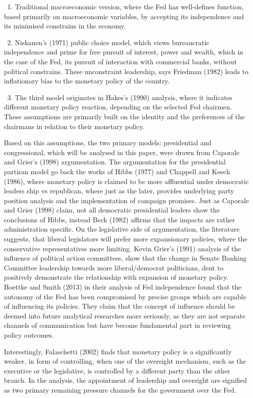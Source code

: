 \documentclass[11pt]{article}
\begin{document}
\ 1. Traditional macroeconomic version, where the Fed has well-defines function, based primarily on macroeconomic variables, by accepting its independence and its minimised constrains in the economy. \

\ 2. Niskanen's (1971) public choice model, which views bureaucratic independence and prime for free pursuit of interest, power and wealth, which in the case of the Fed, its pursuit of interaction with commercial banks, without political constrains. These unconstraint leadership, says Friedman (1982) leads to inflationary bias to the monetary policy of the country. \

\ 3. The third model originates in Hakes's (1990) analysis, where it indicates different monetary policy reaction, depending on the selected Fed chairmen. These assumptions are primarily built on the identity and the preferences of the chairmans in relation to their monetary policy.
 
Based on this assumptions, the two primary models: presidential and congressional, which will be analysed in this paper, were drawn from Caporale and Grier's (1998) argumentation. The argumentation for the presidential partisan model go back the works of Hibbs (1977) and Chappell and Keech  (1986), where monetary policy is claimed to be more affluential under democratic leaders ship vs republican, where just as the later, provides underlying party position analysis and the implementation of campaign promises. Just as Caporale and Grier (1998) claim, not all democratic presidential leaders show the conclusions of Hibbs, instead Beck (1982) affirms that the impacts are rather administration specific.
On the legislative side of argumentation, the literature suggests, that liberal legislators will prefer more expansionary policies, where the conservative representatives more limiting. Kevin Grier's (1991) analysis of the influence of political action committees, show that the change in Senate Banking Committee leadership towards more liberal/democrat politicians, dent to positively demonstrate the relationship with expansion of monetary policy. 
Boettke and Smith (2013) in their analysis of Fed independence found that the autonomy of the Fed has been compromised by precise groups which are capable of influencing its policies. They claim that the concept of influence should be deemed into future analytical researches more seriously, as they are not separate channels of communication but have become fundamental part in reviewing policy outcomes.
\

Interestingly, Falaschetti (2002) finds that monetary policy is a significantly weaker, in form of controlling, when one of the oversight mechanism, such as the executive or the legislative,  is controlled by a different party than the other branch. In the analysis, the appointment of leadership and oversight are signified as two primary remaining pressure channels for the government over the Fed.
\end{document}
